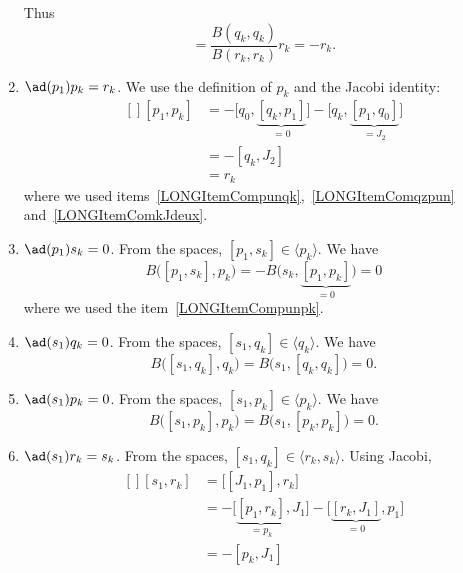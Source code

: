 \begin{enumerate}
\begin{equation}
	\end{equation}
	Thus
	\begin{equation}
		[q_k,J_2]=\frac{ B(q_k,q_k) }{ B(r_k,r_k) }r_k=-r_k.
	\end{equation}
	\item$\ad(p_1)p_k=r_k$\label{LONGItemCompunpk}. We use the definition of $p_k$ and the Jacobi identity:
	\begin{equation}
		\begin{aligned}[]
			[p_1,p_k] & =-\big[ q_0,\underbrace{[q_k,p_1]}_{=0} \big]-\big[ q_k,\underbrace{[p_1,q_0]}_{=J_2} \big] \\
			          & =-[q_k,J_2]                                                                                 \\
			          & =r_k
		\end{aligned}
	\end{equation}
	where we used items~\ref{LONGItemCompunqk},~\ref{LONGItemComqzpun} and~\ref{LONGItemComkJdeux}.
	\item$\ad(p_1)s_k=0$. From the spaces, $[p_1,s_k]\in\langle p_k\rangle$. We have
	\begin{equation}
		B\big( [p_1,s_k],p_k \big)=-B\big( s_k,\underbrace{[p_1,p_k]}_{=0} \big)=0
	\end{equation}
	where we used the item~\ref{LONGItemCompunpk}.
	\item$\ad(s_1)q_k=0$. From the spaces, $[s_1,q_k]\in\langle q_k\rangle$. We have
	\begin{equation}
		B\big( [s_1,q_k],q_k \big)=B\big( s_1,[q_k,q_k] \big)=0.
	\end{equation}
	\item$\ad(s_1)p_k=0$\label{LONGItemComsunpk}. From the spaces, $[s_1,p_k]\in\langle p_k\rangle$. We have
	\begin{equation}
		B\big( [s_1,p_k],p_k \big)=B\big( s_1,[p_k,p_k] \big)=0.
	\end{equation}
	\item$\ad(s_1)r_k=s_k$. From the spaces, $[s_1,q_k]\in\langle r_k,s_k\rangle$. Using Jacobi,
	\begin{equation}
		\begin{aligned}[]
			[s_1,r_k] & =\big[ [J_1,p_1],r_k \big]                                                                  \\
			          & =-\big[ \underbrace{[p_1,r_k]}_{=p_k},J_1 \big]-\big[ \underbrace{[r_k,J_1]}_{=0},p_1 \big] \\
			          & =-[p_k,J_1]                                                                                 \\

\end{aligned}
\end{equation}
\end{enumerate}
